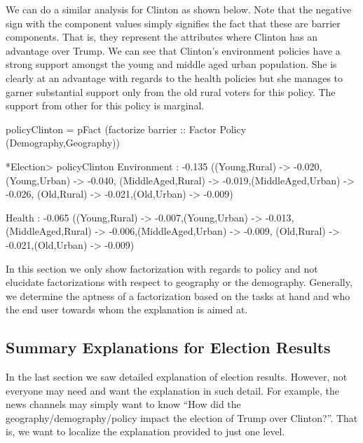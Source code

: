 \documentclass{jfp}
\begin{document}
We can do a similar analysis for Clinton as shown below. Note that the negative sign with the component values simply signifies the fact that these are barrier components. That is, they represent the attributes where Clinton has an advantage over Trump. We can see that Clinton's environment policies have a strong support amongst the young and middle aged urban population. She is clearly at an advantage with regards to the health policies but she manages to garner substantial support only from the old rural voters for this policy. The support from other for this policy is marginal. 
\begin{haskellcode}
policyClinton = pFact (factorize barrier :: Factor Policy (Demography,Geography))

*Election> policyClinton
Environment : -0.135 ({(Young,Rural) -> -0.020,(Young,Urban) -> -0.040,
                       (MiddleAged,Rural) -> -0.019,(MiddleAged,Urban) -> -0.026,
                       (Old,Rural) -> -0.021,(Old,Urban) -> -0.009})

Health : -0.065 ({(Young,Rural) -> -0.007,(Young,Urban) -> -0.013,
                  (MiddleAged,Rural) -> -0.006,(MiddleAged,Urban) -> -0.009,
                  (Old,Rural) -> -0.021,(Old,Urban) -> -0.009})
\end{haskellcode}

In this section we only show factorization with regards to policy and not elucidate factorizations with respect to geography or the demography. Generally, we determine the aptness of a factorization based on the tasks at hand and who the end user towards whom the explanation is aimed at. 

\subsection{Summary Explanations for Election Results}
In the last section we saw detailed explanation of election results. However, not everyone may need and want the explanation in such detail. For example, the news channels may simply want to know ``How did the geography/demography/policy impact the election of Trump over Clinton?''. That is, we want to localize the explanation provided to just one level.
\end{document}
